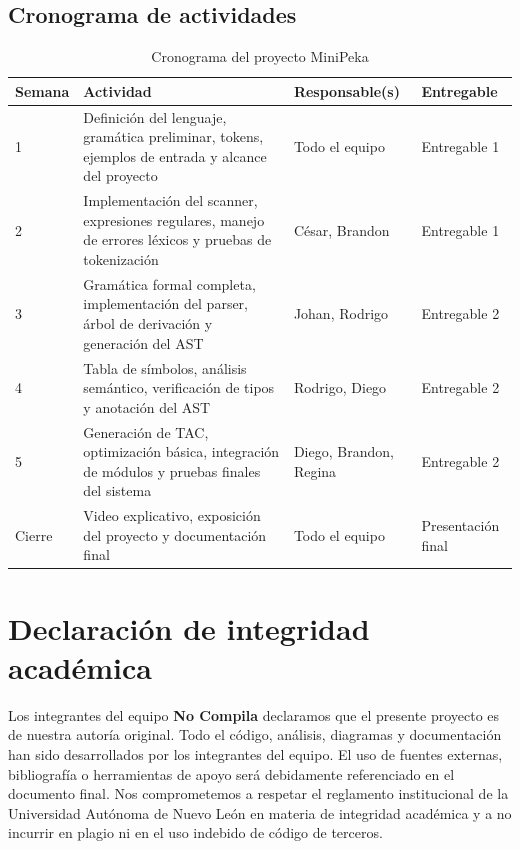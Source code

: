 \documentclass[12pt]{article}
\begin{document}
\subsection{Cronograma de actividades}
\begin{table}[H]
\centering
\renewcommand{\arraystretch}{1.25}
\begin{tabular}{@{}p{1.5cm} p{4.5cm} p{4.2cm} p{2.3cm}@{}}
\toprule
\textbf{Semana} & \textbf{Actividad} &
\textbf{Responsable(s)} & \textbf{Entregable} \\
\midrule
1
    & Definición del lenguaje, gramática preliminar, tokens, ejemplos
      de entrada y alcance del proyecto
    & Todo el equipo
    & Entregable 1 \\
2
    & Implementación del scanner, expresiones regulares, manejo de
      errores léxicos y pruebas de tokenización
    & César, Brandon
    & Entregable 1 \\
3
    & Gramática formal completa, implementación del parser,
      árbol de derivación y generación del AST
    & Johan, Rodrigo
    & Entregable 2 \\
4
    & Tabla de símbolos, análisis semántico, verificación
      de tipos y anotación del AST
    & Rodrigo, Diego
    & Entregable 2 \\
5
    & Generación de TAC, optimización básica, integración
      de módulos y pruebas finales del sistema
    & Diego, Brandon, Regina
    & Entregable 2 \\
Cierre
    & Video explicativo, exposición del proyecto y
      documentación final
    & Todo el equipo
    & Presentación final \\
\bottomrule
\end{tabular}
\caption{Cronograma del proyecto MiniPeka}
\end{table}

\section{Declaración de integridad académica}

Los integrantes del equipo \textbf{No Compila} declaramos que el presente
proyecto es de nuestra autoría original. Todo el código, análisis,
diagramas y documentación han sido desarrollados por los integrantes del
equipo. El uso de fuentes externas, bibliografía o herramientas de apoyo
será debidamente referenciado en el documento final. Nos comprometemos a
respetar el reglamento institucional de la Universidad Autónoma de Nuevo
León en materia de integridad académica y a no incurrir en plagio ni en
el uso indebido de código de terceros.
\end{document}
